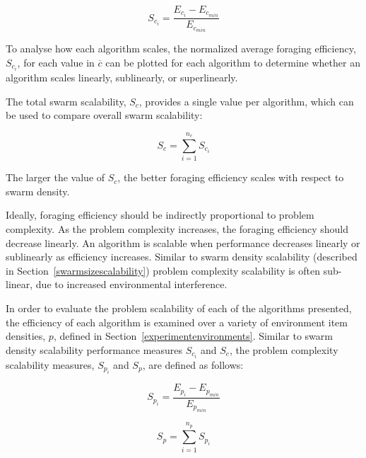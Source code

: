 \documentclass[preprint,12pt]{elsarticle}
\begin{document}
\begin{equation}
S_{c_i} = \dfrac{E_{c_{i}} - E_{c_{min}}}{E_{c_{min}}}
\end{equation}


To analyse how each algorithm scales, the normalized average foraging efficiency, $S_{c_i}$, for each value in $\overline{c}$ can be plotted for each algorithm to determine whether an algorithm scales linearly, sublinearly, or superlinearly. 

The total swarm scalability, $S_c$, provides a single value per algorithm, which can be used to compare overall swarm scalability:

\begin{equation}
	S_c = \sum_{i=1}^{n_c} S_{c_i}
\end{equation}


The larger the value of $S_c$, the better foraging efficiency scales with respect to swarm density. 



Ideally, foraging efficiency should be indirectly proportional to problem complexity. As the problem complexity increases, the foraging efficiency should decrease linearly. An algorithm is scalable when performance decreases linearly or sublinearly as efficiency increases. Similar to swarm density scalability (described in Section~\ref{swarmsizescalability}) problem complexity scalability is often sub-linear, due to increased environmental interference. 

In order to evaluate the problem scalability of each of the algorithms presented, the efficiency of each algorithm is examined over a variety of environment item densities, $p$, defined in Section~\ref{experimentenvironments}. Similar to swarm density scalability performance measures $S_{c_i}$ and $S_c$, the problem complexity scalability measures, $S_{p_i}$ and $S_p$, are defined as follows:

\begin{equation}
	S_{p_i} = \dfrac{E_{p_{i}} - E_{p_{min}}}{E_{p_{min}}}
\end{equation}

\begin{equation}
	S_p = \sum_{i=1}^{n_p} S_{p_i}
\end{equation}
\end{document}
